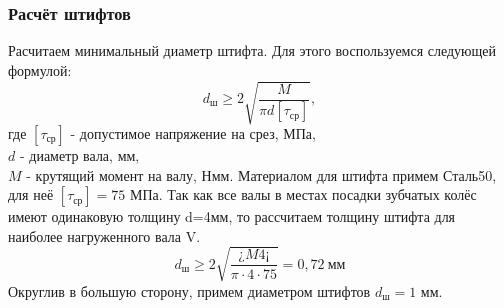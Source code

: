 \documentclass[14pt,a4paper,russian]{scrartcl}
\begin{document}
    \subsubsection{Расчёт штифтов}
        Расчитаем минимальный диаметр штифта. Для этого воспользуемся следующей формулой:
        \[ d_\text{ш} \geq 2\sqrt{\frac{M}{\pi d [\tau_{\text{ср}}]}}, \]
        где \( [\tau_{\text{ср}}] \) - допустимое напряжение на срез, МПа,\\
        \( d \) - диаметр вала, мм,\\
        \( M \) - крутящий момент на валу, Нмм.
        Материалом для штифта примем Сталь50, для неё \( [\tau_{\text{ср}}] =75\) МПа.
        Так как все валы в местах посадки зубчатых колёс имеют одинаковую толщину d=4мм, то рассчитаем
        толщину штифта для наиболее нагруженного вала V.
        \[ d_\text{ш} \geq 2\sqrt{\frac{¿M4¡}{\pi\cdot 4\cdot 75}} = 0,72\ \text{мм} \]
        Округлив в большую сторону, примем диаметром штифтов \( d_\text{ш} = 1 \) мм.
        
\end{document}
